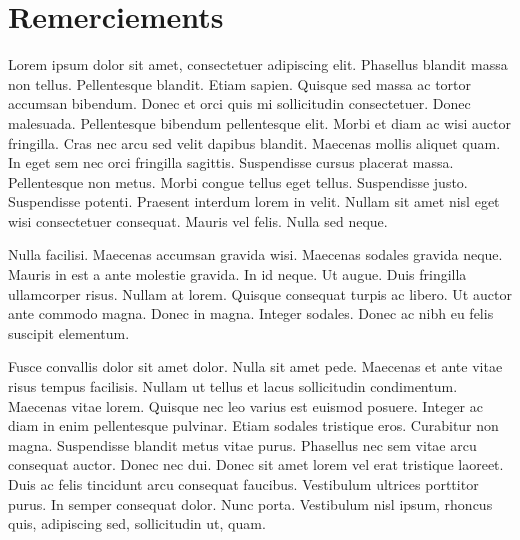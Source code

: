 \documentclass[logos,chaptertoc]{bordeaux-thesis}
\newcommand{\dummytext}{
Lorem ipsum dolor sit amet, consectetuer adipiscing elit. Phasellus blandit massa non tellus. Pellentesque blandit. Etiam sapien. Quisque sed massa ac tortor accumsan bibendum. Donec et orci quis mi sollicitudin consectetuer. Donec malesuada. Pellentesque bibendum pellentesque elit. Morbi et diam ac wisi auctor fringilla. Cras nec arcu sed velit dapibus blandit. Maecenas mollis aliquet quam. In eget sem nec orci fringilla sagittis. Suspendisse cursus placerat massa. Pellentesque non metus. Morbi congue tellus eget tellus. Suspendisse justo. Suspendisse potenti. Praesent interdum lorem in velit. Nullam sit amet nisl eget wisi consectetuer consequat. Mauris vel felis. Nulla sed neque.

Nulla facilisi. Maecenas accumsan gravida wisi. Maecenas sodales gravida neque. Mauris in est a ante molestie gravida. In id neque. Ut augue. Duis fringilla ullamcorper risus. Nullam at lorem. Quisque consequat turpis ac libero. Ut auctor ante commodo magna. Donec in magna. Integer sodales. Donec ac nibh eu felis suscipit elementum.

Fusce convallis dolor sit amet dolor. Nulla sit amet pede. Maecenas et ante vitae risus tempus facilisis. Nullam ut tellus et lacus sollicitudin condimentum. Maecenas vitae lorem. Quisque nec leo varius est euismod posuere. Integer ac diam in enim pellentesque pulvinar. Etiam sodales tristique eros. Curabitur non magna. Suspendisse blandit metus vitae purus. Phasellus nec sem vitae arcu consequat auctor. Donec nec dui. Donec sit amet lorem vel erat tristique laoreet. Duis ac felis tincidunt arcu consequat faucibus. Vestibulum ultrices porttitor purus. In semper consequat dolor. Nunc porta. Vestibulum nisl ipsum, rhoncus quis, adipiscing sed, sollicitudin ut, quam.
}
\begin{document}
\begin{abstract}[english]
In addition to the Solar System and its planets, we now have a database of nearly 1000 planets that emphasize the huge diversity of planets and systems that can be formed. This diversity is a challenge for planetary formation models. Type I migration is one of the mechanisms possible to explain this diversity. Depending on disc properties, planets can migrate inward or outward with respect to their host star. The huge parameter space of protoplanetary disc models can form a huge diversity of planetary systems, in agreement with the diversity observed in the nonetheless small sample accessible to us. Thanks to numerical simulations, I showed that within the same disc, it is possible to form super-Earths or giant planet cores, depending on the migration history of an initial population of embryos.
\end{abstract}


\pagebreak\strut\newpage

\chapter*{Remerciements}
\vfill
\dummytext



\newpage


\strut\newpage

\tableofcontents
\mtcaddchapter %

\listoffigures
\mtcaddchapter %
\end{document}
